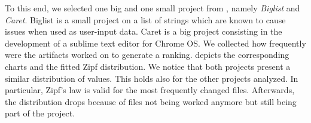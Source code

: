 To this end, we selected one big and one small project from , namely \emph{Biglist} and \emph{Caret}. Biglist is a small project on a list of strings which are known to cause issues when used as user-input data. Caret is a big project consisting in the development of a sublime text editor for Chrome OS.
We collected how frequently were the artifacts worked on to generate a ranking.  depicts the corresponding charts and the fitted Zipf distribution. We notice that both projects present a similar distribution of values. This holds also for the other projects analyzed. In particular, Zipf's law is valid for the most frequently changed files. Afterwards, the distribution drops because of files not being worked anymore but still being part of the project.


